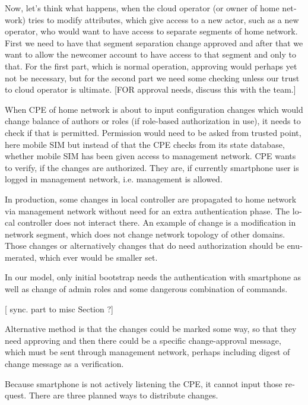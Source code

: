 \documentclass[12pt,a4paper,english]{tutthesis}
\begin{document}
\begin{otherlanguage}{english}
Now, let's think what happens, when the cloud operator (or owner of
home network) tries to modify attributes, which give access to a new actor,
such as a new operator, who would want to have access to separate
segments of home network.  First we need to have that segment separation
change approved and after that we want to allow the newcomer account
to have access to that segment and only to that. For the first part,
which is normal operation, approving would perhaps yet not be
necessary, but for the second part we need some checking unless our
trust to cloud operator is ultimate.  [FOR approval needs, discuss
this with the team.]




When CPE of home network is about to input configuration changes which
would change balance of authors or roles (if role-based authorization
in use), it needs to check if that is permitted.  Permission would 
need to be asked from trusted point, here mobile SIM but instead of
that the CPE checks from its state database, 
whether mobile SIM has been given access to management network.
CPE wants to verify, if the changes are authorized. They are, if currently
smartphone user is logged in management network, i.e. management is allowed.


In production, some changes in local controller are propagated to home network
via management network without need for an extra authentication phase.
The local controller does not interact there. An example of change is
a modification in network segment, which does not change network topology of other domains.
Those changes or alternatively changes that do need authorization
should be enumerated, which ever would be smaller set.  

In our model, only initial bootstrap needs the authentication with
smartphone as well as change of admin roles and some dangerous
combination of commands.

[ sync. part to misc Section ?]






Alternative method is that the changes could be marked some way, so that they need
approving and then there could be a specific change-approval message,
which must be sent through management network, perhaps including digest
of change message as a verification.

Because smartphone is not actively listening the CPE, it cannot input
those request. There are three planned ways to distribute changes.


\end{otherlanguage}
\end{document}
